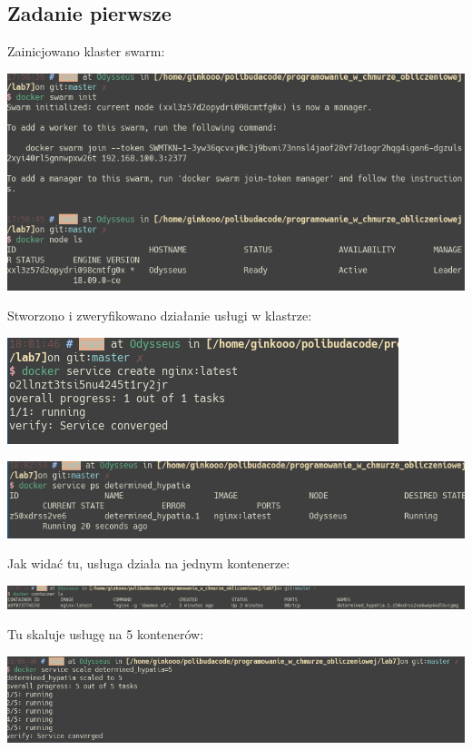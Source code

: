 \documentclass[12pt]{article}
\begin{document}
    \subsection{Zadanie pierwsze}

    Zainicjowano klaster swarm:

    \includegraphics[width=\textwidth]{1_1.png}

    Stworzono i zweryfikowano działanie usługi w klastrze:

    \includegraphics[width=\textwidth]{1_2.png}

    \includegraphics[width=\textwidth]{1_3.png}

    Jak widać tu, usługa działa na jednym kontenerze:

    \includegraphics[width=\textwidth]{1_4.png}

    Tu skaluje usługę na 5 kontenerów:

    \includegraphics[width=\textwidth]{1_5.png}
\end{document}
